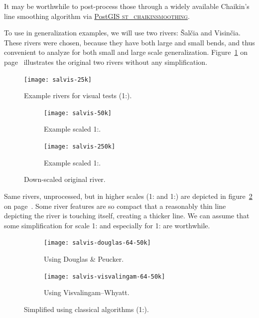 \documentclass[a4paper]{article}
\newcommand{\onpage}[1]{\ref{#1} on page~\pageref{#1}}
\newcommand{\DP}{Douglas \& Peucker}
\newcommand{\VW}{Visvalingam--Whyatt}
\begin{document}
It may be worthwhile to post-process those through a widely available Chaikin's
line smoothing algorithm\cite{chaikin1974algorithm} via
\href{https://postgis.net/docs/ST_ChaikinSmoothing.html}{PostGIS
\textsc{st\_chaikinsmoothing}}.

To use in generalization examples, we will use two rivers: Šalčia and Visinčia.
These rivers were chosen, because they have both large and small bends, and
thus convenient to analyze for both small and large scale generalization.
Figure~\onpage{fig:salvis-25} illustrates the original two rivers without any
simplification.

\begin{figure}[ht]
    \centering
    \texttt{[image: salvis-25k]}
    \caption{Example rivers for visual tests (1:{}).}
    \label{fig:salvis-25}
\end{figure}

\begin{figure}[ht]
    \centering
    \begin{subfigure}[b]{.49\textwidth}
        \texttt{[image: salvis-50k]}
        \caption{Example scaled 1:.}
    \end{subfigure}
    \hfill
    \begin{subfigure}[b]{.49\textwidth}
        \centering
        \texttt{[image: salvis-250k]}
        \caption{Example scaled 1:.}
    \end{subfigure}
    \caption{Down-scaled original river.}
    \label{fig:salvis-50-250}
\end{figure}

Same rivers, unprocessed, but in higher scales (1: and
1:) are depicted in figure~\onpage{fig:salvis-50-250}. Some
river features are so compact that a reasonably thin line depicting the river
is touching itself, creating a thicker line. We can assume that some
simplification for scale 1: and especially for
1: are worthwhile.

\begin{figure}[ht]
    \centering
    \begin{subfigure}[b]{.49\textwidth}
        \texttt{[image: salvis-douglas-64-50k]}
        \caption{Using {\DP}.}
    \end{subfigure}
    \hfill
    \begin{subfigure}[b]{.49\textwidth}
        \texttt{[image: salvis-visvalingam-64-50k]}
        \caption{Using {\VW}.}
    \end{subfigure}
    \caption{Simplified using classical algorithms (1:).}
    \label{fig:salvis-generalized-50k}
\end{figure}
\end{document}
